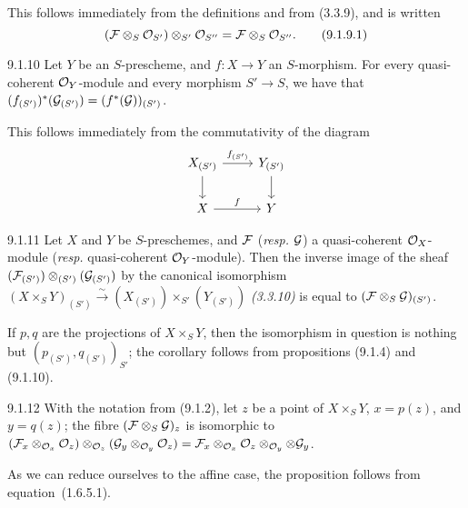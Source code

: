 \documentclass[../main.tex]{subfiles}
\begin{document}
This follows immediately from the definitions and from (3.3.9), and is written
\begin{equation*}
    (\mathcal{F}\otimes_S\mathcal{O}_{S'})\otimes_{S'}\mathcal{O}_{S''} = \mathcal{F}\otimes_S\mathcal{O}_{S''}.\tag{9.1.9.1}
\end{equation*}

\begin{env}[Proposition]{9.1.10}
    Let $Y$ be an $S$-prescheme, and $f\colon X\to Y$ an $S$-morphism.
    For every quasi-coherent $\mathcal{O}_Y$-module and every morphism $S'\to S$, we have that $(f_{(S')})^*(\mathcal{G}_{(S')})=(f^*(\mathcal{G}))_{(S')}$.
\end{env}

This follows immediately from the commutativity of the diagram
\begin{equation*}
    \begin{tikzcd}
        X_{(S')}
            \ar{r}{f_{(S')}}
            \ar{d}
        & Y_{(S')}
            \ar{d}\\
        X
            \ar{r}{f}
        & Y
    \end{tikzcd}
\end{equation*}

\begin{env}[Corollary]{9.1.11}
    Let $X$ and $Y$ be $S$-preschemes, and $\mathcal{F}$ (\emph{resp.} $\mathcal{G}$) a quasi-coherent $\mathcal{O}_X$-module (\emph{resp.} quasi-coherent $\mathcal{O}_Y$-module).
    Then the inverse image of the sheaf $(\mathcal{F}_{(S')})\otimes_{(S')}(\mathcal{G}_{(S')})$ by the canonical isomorphism $(X\times_S Y)_{(S')}\xrightarrow{\sim}(X_{(S')})\times_{S'}(Y_{(S')})$ \emph{(3.3.10)} is equal to $(\mathcal{F}\otimes_S\mathcal{G})_{(S')}$.
\end{env}

If $p,q$ are the projections of $X\times_S Y$, then the isomorphism in question is nothing but $(p_{(S')}, q_{(S')})_{S'}$; the corollary follows from propositions (9.1.4) and (9.1.10).

\begin{env}[Proposition]{9.1.12}
    With the notation from (9.1.2), let $z$ be a point of $X\times_S Y$, $x=p(z)$, and $y=q(z)$; the fibre $(\mathcal{F}\otimes_S\mathcal{G})_z$ is isomorphic to $(\mathcal{F}_x\otimes_{\mathcal{O}_x}\mathcal{O}_z)\otimes_{\mathcal{O}_z}(\mathcal{G}_y\otimes_{\mathcal{O}_y}\mathcal{O}_z) = \mathcal{F}_x\otimes_{\mathcal{O}_x}\mathcal{O}_z\otimes_{\mathcal{O}_y}\otimes\mathcal{G}_y$.
\end{env}

As we can reduce ourselves to the affine case, the proposition follows from equation~(1.6.5.1).
\end{document}
